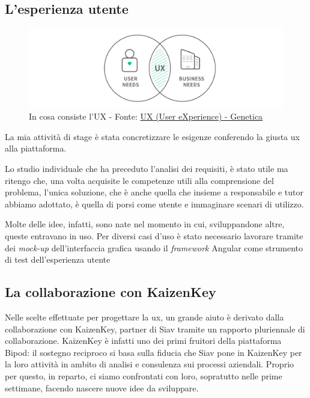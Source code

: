 \subsection{L'esperienza utente}
\begin{figure}[H]
    \centering
    \includegraphics[width=0.80\columnwidth]{immagini/uxneeds.png}
    \caption{In cosa consiste l'UX - Fonte: \href{https://www.genetica.marketing/user-experience-di-cosa-si-tratta/}{UX (User eXperience) - Genetica}}
    \label{fig:my_label}
\end{figure}
La mia attività di stage è stata concretizzare le esigenze conferendo la giusta \acrshort{ux} alla piattaforma.

Lo studio individuale che ha preceduto l'analisi dei requisiti, è stato utile ma ritengo che, una volta acquisite le competenze utili alla comprensione del problema, l'unica soluzione, che è anche quella che insieme a responsabile e tutor abbiamo adottato, è quella di porsi come utente e immaginare scenari di utilizzo.

Molte delle idee, infatti, sono nate nel momento in cui, sviluppandone altre, queste entravano in uso.
Per diversi casi d'uso è stato necessario lavorare tramite dei \textit{mock-up} dell'interfaccia grafica usando il \textit{framework} Angular come strumento di test dell'esperienza utente


\subsection{La collaborazione con KaizenKey}
Nelle scelte effettuate per progettare la \acrlong{ux}, un grande aiuto è derivato dalla collaborazione con KaizenKey, partner di Siav tramite un rapporto pluriennale di collaborazione. KaizenKey è infatti uno dei primi fruitori della piattaforma Bipod: il sostegno reciproco si basa sulla fiducia che Siav pone in KaizenKey per la loro attività in ambito di analisi e consulenza sui processi aziendali. Proprio per questo, in reparto, ci siamo confrontati con loro, sopratutto nelle prime settimane, facendo nascere nuove idee da sviluppare.

